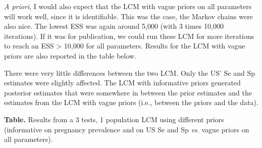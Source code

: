 \documentclass[
]{book}
\begin{document}
\emph{A priori}, I would also expect that the LCM with vague priors on all parameters will work well, since it is identifiable. This was the case, the Markov chains were also nice. The lowest ESS was again around 5,000 (with 3 times 10,000 iterations). If it was for publication, we could run these LCM for more iterations to reach an ESS \textgreater{} 10,000 for all parameters. Results for the LCM with vague priors are also reported in the table below.

There were very little differences between the two LCM. Only the US' Se and Sp estimates were slightly affected. The LCM with informative priors generated posterior estimates that were somewhere in between the prior estimates and the estimates from the LCM with vague priors (i.e., between the priors and the data).

\textbf{Table.} Results from a 3 tests, 1 population LCM using different priors (informative on pregnancy prevalence and on US Se and Sp \emph{vs.} vague priors on all parameters).
\end{document}
